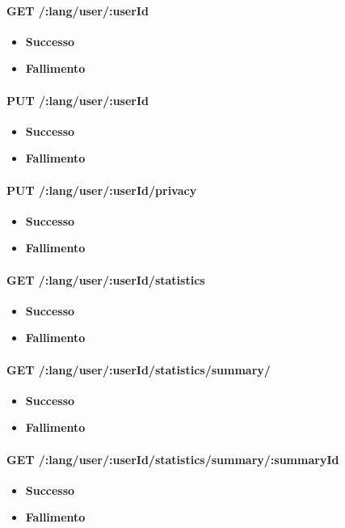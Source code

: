 \paragraph{GET /:lang/user/:userId}
\begin{itemize}
\item \textbf{Successo}
\item \textbf{Fallimento}
\end{itemize}

\paragraph{PUT /:lang/user/:userId}
\begin{itemize}
\item \textbf{Successo}
\item \textbf{Fallimento}
\end{itemize}

\paragraph{PUT /:lang/user/:userId/privacy}
\begin{itemize}
\item \textbf{Successo}
\item \textbf{Fallimento}
\end{itemize}


\paragraph{GET /:lang/user/:userId/statistics}
\begin{itemize}
\item \textbf{Successo}
\item \textbf{Fallimento}
\end{itemize}

\paragraph{GET /:lang/user/:userId/statistics/summary/}
\begin{itemize}
\item \textbf{Successo}
\item \textbf{Fallimento}
\end{itemize}


\paragraph{GET /:lang/user/:userId/statistics/summary/:summaryId}
\begin{itemize}
\item \textbf{Successo}
\item \textbf{Fallimento}
\end{itemize}



